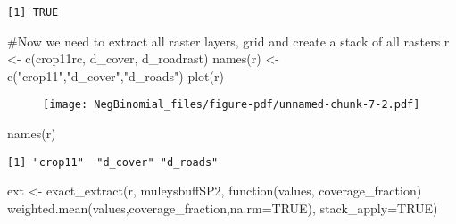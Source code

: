 \documentclass[
  letterpaper,
]{book}
\newenvironment{Shaded}{\begin{snugshade}}{\end{snugshade}}
\newcommand{\AttributeTok}[1]{\textcolor[rgb]{0.40,0.45,0.13}{#1}}
\newcommand{\CommentTok}[1]{\textcolor[rgb]{0.37,0.37,0.37}{#1}}
\newcommand{\ConstantTok}[1]{\textcolor[rgb]{0.56,0.35,0.01}{#1}}
\newcommand{\ControlFlowTok}[1]{\textcolor[rgb]{0.00,0.23,0.31}{#1}}
\newcommand{\FunctionTok}[1]{\textcolor[rgb]{0.28,0.35,0.67}{#1}}
\newcommand{\NormalTok}[1]{\textcolor[rgb]{0.00,0.23,0.31}{#1}}
\newcommand{\OtherTok}[1]{\textcolor[rgb]{0.00,0.23,0.31}{#1}}
\newcommand{\StringTok}[1]{\textcolor[rgb]{0.13,0.47,0.30}{#1}}
\begin{document}
\begin{verbatim}
[1] TRUE
\end{verbatim}

\begin{Shaded}
\begin{Highlighting}[]
\CommentTok{\#Now we need to extract all raster layers, grid and create a stack of all rasters}
\NormalTok{r }\OtherTok{\textless{}{-}} \FunctionTok{c}\NormalTok{(crop11rc, d\_cover, d\_roadrast)}
\FunctionTok{names}\NormalTok{(r) }\OtherTok{\textless{}{-}} \FunctionTok{c}\NormalTok{(}\StringTok{"crop11"}\NormalTok{,}\StringTok{"d\_cover"}\NormalTok{,}\StringTok{"d\_roads"}\NormalTok{)}
\FunctionTok{plot}\NormalTok{(r)}
\end{Highlighting}
\end{Shaded}

\begin{figure}[H]

{\centering \texttt{[image: NegBinomial\_files/figure-pdf/unnamed-chunk-7-2.pdf]}

}

\end{figure}

\begin{Shaded}
\begin{Highlighting}[]
\FunctionTok{names}\NormalTok{(r)}
\end{Highlighting}
\end{Shaded}

\begin{verbatim}
[1] "crop11"  "d_cover" "d_roads"
\end{verbatim}

\begin{Shaded}
\begin{Highlighting}[]
\NormalTok{ext }\OtherTok{\textless{}{-}} \FunctionTok{exact\_extract}\NormalTok{(r, muleysbuffSP2, }\ControlFlowTok{function}\NormalTok{(values, coverage\_fraction) }\FunctionTok{weighted.mean}\NormalTok{(values,coverage\_fraction,}\AttributeTok{na.rm=}\ConstantTok{TRUE}\NormalTok{), }\AttributeTok{stack\_apply=}\ConstantTok{TRUE}\NormalTok{)}
\end{Highlighting}
\end{Shaded}
\end{document}
